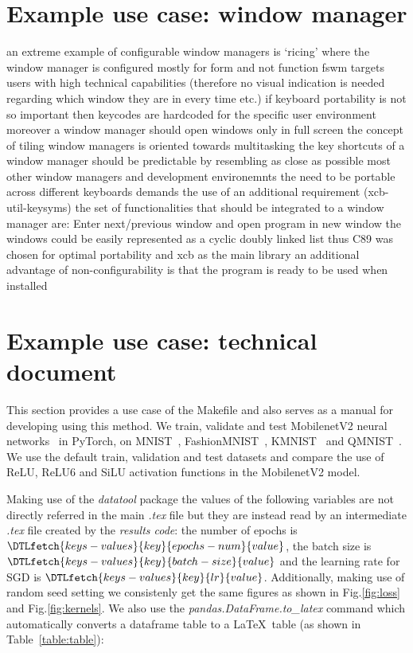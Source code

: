 \documentclass[journal]{IEEEtran}
\begin{document}
\section{Example use case: window manager}
an extreme example of configurable window managers is `ricing' where the window manager is configured mostly for form and not function
fswm targets users with high technical capabilities (therefore no visual indication is needed regarding which window they are in every time etc.)
if keyboard portability is not so important then keycodes are hardcoded for the specific user environment
moreover a window manager should open windows only in full screen
the concept of tiling window managers is oriented towards multitasking
the key shortcuts of a window manager should be predictable by resembling as close as possible most other window managers and development environemnts
the need to be portable across different keyboards demands the use of an additional requirement (xcb-util-keysyms)
the set of functionalities that should be integrated to a window manager are: Enter next/previous window and open program in new window
the windows could be easily represented as a cyclic doubly linked list
thus C89 was chosen for optimal portability and xcb as the main library
an additional advantage of non-configurability is that the program is ready to be used when installed

\section{Example use case: technical document}
This section provides a use case of the Makefile and also serves as a manual for developing using this method.
We train, validate and test MobilenetV2 neural networks~\cite{sandler2018mobilenetv2} in PyTorch, on MNIST~\cite{lecun2010mnist}, FashionMNIST~\cite{xiao2017fashion}, KMNIST~\cite{clanuwat2018deep} and QMNIST~\cite{yadav2019cold}.
We use the default train, validation and test datasets and compare the use of ReLU, ReLU6\cite{dahl2013improving} and SiLU\cite{elfwing2018sigmoid} activation functions in the MobilenetV2 model.

Making use of the \textit{datatool} package the values of the following variables are not directly referred in the main \textit{.tex} file but they are instead read by an intermediate \textit{.tex} file created by the \textit{results code}: the number of epochs is $\DTLfetch{keys-values}{key}{epochs-num}{value}$, the batch size is $\DTLfetch{keys-values}{key}{batch-size}{value}$ and the learning rate for SGD is $\DTLfetch{keys-values}{key}{lr}{value}$.
Additionally, making use of random seed setting we consistenly get the same figures as shown in Fig.\ref{fig:loss} and Fig.\ref{fig:kernels}.
We also use the \textit{pandas.DataFrame.to\_latex} command which automatically converts a dataframe table to a \LaTeX\ table (as shown in Table~\ref{table:table}):
\end{document}
